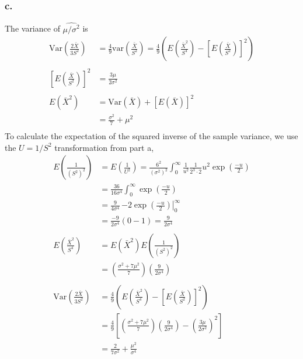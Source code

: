 \documentclass{article}
\begin{document}
\subsubsection*{c.}
The variance of $\widehat{\mu/\sigma^2}$ is 
\begin{align*}
\mathrm{Var}\left(\frac{2\bar{X}}{3S^2}\right) &= \frac{4}{9}\mathrm{var}\left(\frac{\bar{X}}{S^2}\right) = \frac{4}{9}\left(E\left(\frac{\bar{X}^2}{S^4}\right) - \left[E\left(\frac{\bar{X}}{S^2}\right)\right]^2\right) \\ \\
\left[E\left(\frac{\bar{X}}{S^2}\right)\right]^2 &= \frac{3\mu}{2\sigma^2} \\ \\
E(\bar{X}^2) &= \mathrm{Var}(\bar{X}) + \left[E(\bar{X})\right]^2 \\
&=\frac{\sigma^2}{7} + \mu^2 \\
\end{align*}
To calculate the expectation of the squared inverse of the sample variance, we use the $U = 1/S^2$ transformation from part a,
\begin{align*}
E\left(\frac{1}{\left(S^2\right)^2}\right) &= E\left(\frac{1}{U^2}\right) = \frac{6^2}{(\sigma^2)^2}\int_0^\infty\frac{1}{u^2}\frac{1}{2^3\cdot2}u^2\exp\left(\frac{-u}{2}\right) \\
&=\frac{36}{16\sigma^4}\int_0^\infty\exp\left(\frac{-u}{2}\right) \\
&=\frac{9}{4\sigma^4}\,\left.-2\exp\left(\frac{-u}{2}\right)\right|_0^\infty \\
&=\frac{-9}{2\sigma^4}\left(0-1\right) = \frac{9}{2\sigma^4} \\ \\
E\left(\frac{\bar{X}^2}{S^4}\right) &= E(\bar{X}^2)E\left(\frac{1}{\left(S^2\right)^2}\right)\\
&=  \left(\frac{\sigma^2+7\mu^2}{7}\right)\left(\frac{9}{2\sigma^4}\right) \\ \\
\mathrm{Var}\left(\frac{2\bar{X}}{3S^2}\right) &= \frac{4}{9}\left(E\left(\frac{\bar{X}^2}{S^4}\right) - \left[E\left(\frac{\bar{X}}{S^2}\right)\right]^2\right) \\
&=\frac{4}{9}\left[\left(\frac{\sigma^2+7\mu^2}{7}\right)\left(\frac{9}{2\sigma^4}\right) - \left(\frac{3\mu}{2\sigma^2}\right)^2\right] \\
&= \frac{2}{7\sigma^2}+\frac{\mu^2}{\sigma^4}
\end{align*}
\end{document}
